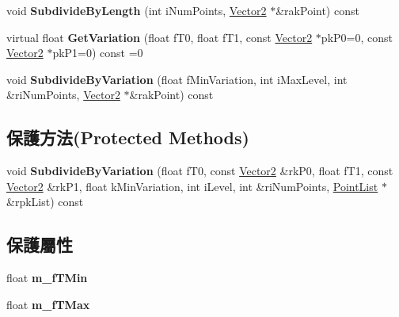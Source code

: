 \begin{DoxyCompactItemize}
\item 
void {\bfseries Subdivide\+By\+Length} (int i\+Num\+Points, \hyperlink{class_magnum_1_1_vector2}{Vector2} $\ast$\&rak\+Point) const \hypertarget{class_magnum_1_1_curve2_a7bd2776943ba2170cebb3fdd5262d564}{}\label{class_magnum_1_1_curve2_a7bd2776943ba2170cebb3fdd5262d564}

\item 
virtual float {\bfseries Get\+Variation} (float f\+T0, float f\+T1, const \hyperlink{class_magnum_1_1_vector2}{Vector2} $\ast$pk\+P0=0, const \hyperlink{class_magnum_1_1_vector2}{Vector2} $\ast$pk\+P1=0) const  =0\hypertarget{class_magnum_1_1_curve2_a15bd8ad111054adddc592af373bc3910}{}\label{class_magnum_1_1_curve2_a15bd8ad111054adddc592af373bc3910}

\item 
void {\bfseries Subdivide\+By\+Variation} (float f\+Min\+Variation, int i\+Max\+Level, int \&ri\+Num\+Points, \hyperlink{class_magnum_1_1_vector2}{Vector2} $\ast$\&rak\+Point) const \hypertarget{class_magnum_1_1_curve2_a0de36294c1e749403d990f453b3552c7}{}\label{class_magnum_1_1_curve2_a0de36294c1e749403d990f453b3552c7}

\end{DoxyCompactItemize}
\subsection*{保護方法(Protected Methods)}
\begin{DoxyCompactItemize}
\item 
void {\bfseries Subdivide\+By\+Variation} (float f\+T0, const \hyperlink{class_magnum_1_1_vector2}{Vector2} \&rk\+P0, float f\+T1, const \hyperlink{class_magnum_1_1_vector2}{Vector2} \&rk\+P1, float k\+Min\+Variation, int i\+Level, int \&ri\+Num\+Points, \hyperlink{class_magnum_1_1_curve2_1_1_point_list}{Point\+List} $\ast$\&rpk\+List) const \hypertarget{class_magnum_1_1_curve2_a362873293588b797833492be2a5b2b7f}{}\label{class_magnum_1_1_curve2_a362873293588b797833492be2a5b2b7f}

\end{DoxyCompactItemize}
\subsection*{保護屬性}
\begin{DoxyCompactItemize}
\item 
float {\bfseries m\+\_\+f\+T\+Min}\hypertarget{class_magnum_1_1_curve2_a08115323c2403315ae6c673695387b6a}{}\label{class_magnum_1_1_curve2_a08115323c2403315ae6c673695387b6a}

\item 
float {\bfseries m\+\_\+f\+T\+Max}\hypertarget{class_magnum_1_1_curve2_acfb2add71ff3d3458cc59ea4ece98b72}{}\label{class_magnum_1_1_curve2_acfb2add71ff3d3458cc59ea4ece98b72}

\end{DoxyCompactItemize}


